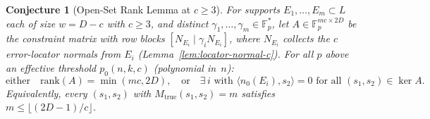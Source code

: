 \documentclass[11pt]{article}
\newtheorem{conjecture}[theorem]{Conjecture}
\newcommand{\FF}{\mathbb{F}}
\begin{document}
\begin{conjecture}[Open-Set Rank Lemma at $c \geq 3$]
\label{conj:openset-rank}
For supports $E_1, \ldots, E_m \subset L$ each of size $w = D - c$ with $c \geq 3$, and distinct $\gamma_1, \ldots, \gamma_m \in \FF_p^*$, let $A \in \FF_p^{mc \times 2D}$ be the constraint matrix with row blocks $[N_{E_i} \mid \gamma_i N_{E_i}]$, where $N_{E_i}$ collects the $c$ error-locator normals from $E_i$ (Lemma~\ref{lem:locator-normal-c}). For all $p$ above an effective threshold $p_0(n, k, c)$ (polynomial in~$n$):
\[
   \text{either} \quad \mathrm{rank}(A) = \min(mc, 2D), \quad \text{or} \quad \exists\, i \text{ with } \langle n_0(E_i), s_2 \rangle = 0 \text{ for all } (s_1, s_2) \in \ker A.
\]
Equivalently, every $(s_1, s_2)$ with $M_{\mathrm{true}}(s_1, s_2) = m$ satisfies $m \leq \lfloor (2D - 1)/c \rfloor$.
\end{conjecture}
\end{document}
